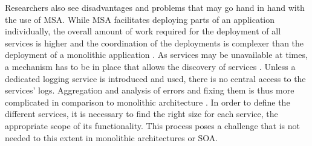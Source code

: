 Researchers also see disadvantages and problems that may go hand in hand with the use of \ac{MSA}.
While \ac{MSA} facilitates deploying parts of an application individually, the overall amount of work required for the deployment of all services is higher and the coordination of the deployments is complexer than the deployment of a monolithic application \cite[p.~35]{Stubbs2015Distributed}.
As services may be unavailable at times, a mechanism has to be in place that allows the discovery of services \cite[p.~35]{Stubbs2015Distributed}.
Unless a dedicated logging service is introduced and used, there is no central access to the services' logs. Aggregation and analysis of errors and fixing them is thus more complicated in comparison to monolithic architecture \cite[p.~35]{Stubbs2015Distributed}.
In order to define the different services, it is necessary to find the right size for each service, \ie the appropriate scope of its functionality. This process poses a challenge that is not needed to this extent in monolithic architectures or \ac{SOA}.
